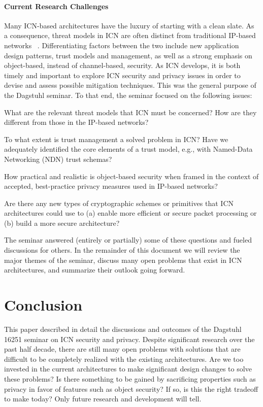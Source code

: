 \documentclass{sig-alternate-05-2015}
\begin{document}
\paragraph{Current Research Challenges}
Many ICN-based architectures have the luxury of starting with a clean slate.
As a consequence, threat models in ICN are often distinct from traditional IP-based
networks ~\cite{wsv-bdpts-13,gtuz-ddndn-13}. Differentiating factors between the two include
new application design patterns, trust models and management, as well as a strong
emphasis on object-based, instead of channel-based, security. As ICN develops, it is both
timely and important to explore ICN security and privacy issues in order to devise and
assess possible mitigation techniques. This was the general purpose of the Dagstuhl
seminar. To that end, the seminar focused on the following issues:
%
\begin{compactitem}
\item What are the relevant threat models that ICN must be concerned? How are
they different from those in the IP-based networks?
\item To what extent is trust management a solved problem in ICN? Have we adequately
identified the core elements of a trust model, e.g., with Named-Data Networking (NDN) trust schemas?
\item How practical and realistic is object-based security when framed in the
context of accepted, best-practice privacy measures used in IP-based networks?
\item Are there any new types of cryptographic schemes or primitives that ICN architectures
could use to (a) enable more efficient or secure packet
processing or (b) build a more secure architecture?
\end{compactitem}
%
The seminar answered (entirely or partially) some of these questions and fueled discussions
for others. In the remainder of this document we will review the major themes of the
seminar, discuss many open problems that exist in ICN architectures, and summarize
their outlook going forward.




\section{Conclusion}
This paper described in detail the discussions and outcomes of the Dagstuhl 16251
seminar on ICN security and privacy. Despite significant research over the past
half decade, there are still many open problems with solutions that are difficult
to be completely realized with the existing architectures. Are we too invested in
the current architectures to make significant design changes to solve these problems?
Is there something to be gained by sacrificing properties such as privacy in favor
of features such as object security? If so, is this the right tradeoff to make today?
Only future research and development will tell.
\end{document}
